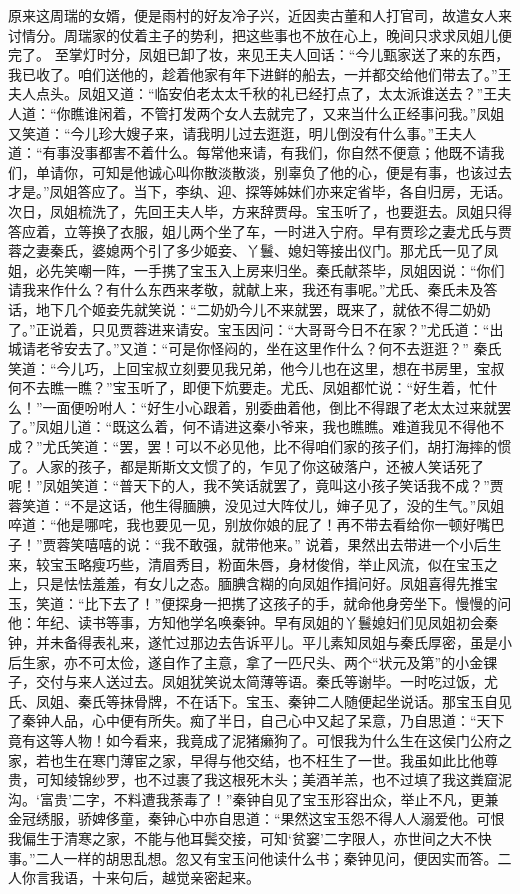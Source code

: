 \documentclass[12pt,oneside]{book}
\begin{document}
原来这周瑞的女婿，便是雨村的好友冷子兴，近因卖古董和人打官司，故遣女人来讨情分。周瑞家的仗着主子的势利，把这些事也不放在心上，晚间只求求凤姐儿便完了。
至掌灯时分，凤姐已卸了妆，来见王夫人回话：“今儿甄家送了来的东西，我已收了。咱们送他的，趁着他家有年下进鲜的船去，一并都交给他们带去了。”王夫人点头。凤姐又道：“临安伯老太太千秋的礼已经打点了，太太派谁送去？”王夫人道：“你瞧谁闲着，不管打发两个女人去就完了，又来当什么正经事问我。”凤姐又笑道：“今儿珍大嫂子来，请我明儿过去逛逛，明儿倒没有什么事。”王夫人道：“有事没事都害不着什么。每常他来请，有我们，你自然不便意；他既不请我们，单请你，可知是他诚心叫你散淡散淡，别辜负了他的心，便是有事，也该过去才是。”凤姐答应了。当下，李纨、迎、探等姊妹们亦来定省毕，各自归房，无话。
次日，凤姐梳洗了，先回王夫人毕，方来辞贾母。宝玉听了，也要逛去。凤姐只得答应着，立等换了衣服，姐儿两个坐了车，一时进入宁府。早有贾珍之妻尤氏与贾蓉之妻秦氏，婆媳两个引了多少姬妾、丫鬟、媳妇等接出仪门。那尤氏一见了凤姐，必先笑嘲一阵，一手携了宝玉入上房来归坐。秦氏献茶毕，凤姐因说：“你们请我来作什么？有什么东西来孝敬，就献上来，我还有事呢。”尤氏、秦氏未及答话，地下几个姬妾先就笑说：“二奶奶今儿不来就罢，既来了，就依不得二奶奶了。”正说着，只见贾蓉进来请安。宝玉因问：“大哥哥今日不在家？”尤氏道：“出城请老爷安去了。”又道：“可是你怪闷的，坐在这里作什么？何不去逛逛？”
秦氏笑道：“今儿巧，上回宝叔立刻要见我兄弟，他今儿也在这里，想在书房里，宝叔何不去瞧一瞧？”宝玉听了，即便下炕要走。尤氏、凤姐都忙说：“好生着，忙什么！”一面便吩咐人：“好生小心跟着，别委曲着他，倒比不得跟了老太太过来就罢了。”凤姐儿道：“既这么着，何不请进这秦小爷来，我也瞧瞧。难道我见不得他不成？”尤氏笑道：“罢，罢！可以不必见他，比不得咱们家的孩子们，胡打海摔的惯了。人家的孩子，都是斯斯文文惯了的，乍见了你这破落户，还被人笑话死了呢！”凤姐笑道：“普天下的人，我不笑话就罢了，竟叫这小孩子笑话我不成？”贾蓉笑道：“不是这话，他生得腼腆，没见过大阵仗儿，婶子见了，没的生气。”凤姐啐道：“他是哪咤，我也要见一见，别放你娘的屁了！再不带去看给你一顿好嘴巴子！”贾蓉笑嘻嘻的说：“我不敢强，就带他来。”
说着，果然出去带进一个小后生来，较宝玉略瘦巧些，清眉秀目，粉面朱唇，身材俊俏，举止风流，似在宝玉之上，只是怯怯羞羞，有女儿之态。腼腆含糊的向凤姐作揖问好。凤姐喜得先推宝玉，笑道：“比下去了！”便探身一把携了这孩子的手，就命他身旁坐下。慢慢的问他：年纪、读书等事，方知他学名唤秦钟。早有凤姐的丫鬟媳妇们见凤姐初会秦钟，并未备得表礼来，遂忙过那边去告诉平儿。平儿素知凤姐与秦氏厚密，虽是小后生家，亦不可太俭，遂自作了主意，拿了一匹尺头、两个“状元及第”的小金锞子，交付与来人送过去。凤姐犹笑说太简薄等语。秦氏等谢毕。一时吃过饭，尤氏、凤姐、秦氏等抹骨牌，不在话下。宝玉、秦钟二人随便起坐说话。那宝玉自见了秦钟人品，心中便有所失。痴了半日，自己心中又起了呆意，乃自思道：“天下竟有这等人物！如今看来，我竟成了泥猪癞狗了。可恨我为什么生在这侯门公府之家，若也生在寒门薄宦之家，早得与他交结，也不枉生了一世。我虽如此比他尊贵，可知绫锦纱罗，也不过裹了我这根死木头；美酒羊羔，也不过填了我这粪窟泥沟。‘富贵’二字，不料遭我荼毒了！”秦钟自见了宝玉形容出众，举止不凡，更兼金冠绣服，骄婢侈童，秦钟心中亦自思道：“果然这宝玉怨不得人人溺爱他。可恨我偏生于清寒之家，不能与他耳鬓交接，可知‘贫窭’二字限人，亦世间之大不快事。”二人一样的胡思乱想。忽又有宝玉问他读什么书；秦钟见问，便因实而答。二人你言我语，十来句后，越觉亲密起来。
\end{document}
